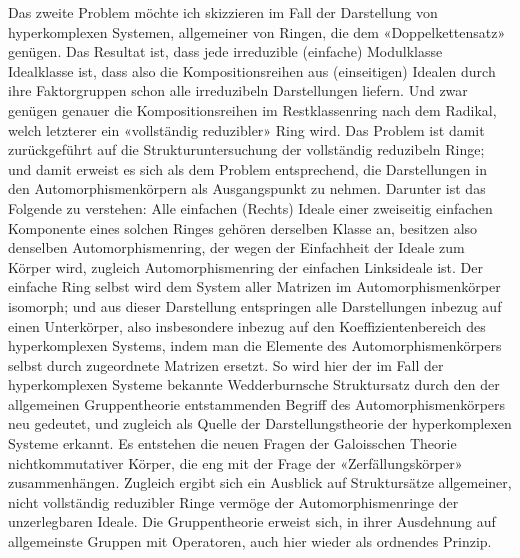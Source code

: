 \documentclass[11pt]{article}
\begin{document}
Das zweite Problem möchte ich skizzieren im Fall der Darstellung von hyperkomplexen Systemen, allgemeiner von Ringen, die dem «Doppelkettensatz» genügen. Das Resultat ist, dass jede irreduzible (einfache) Modulklasse Idealklasse ist, dass also die Kompositionsreihen aus (einseitigen) Idealen durch ihre Faktorgruppen schon alle irreduzibeln Darstellungen liefern. Und zwar genügen genauer die Kompositionsreihen im Restklassenring nach dem Radikal, welch letzterer ein «vollständig reduzibler» Ring wird. Das Problem ist damit zurückgeführt auf die Strukturuntersuchung der vollständig reduzibeln Ringe; und damit erweist es sich als dem Problem entsprechend, die Darstellungen in den Automorphismenkörpern als Ausgangspunkt zu nehmen. Darunter ist das Folgende zu verstehen: Alle einfachen (Rechts) Ideale einer zweiseitig einfachen Komponente eines solchen Ringes gehören derselben Klasse an, besitzen also denselben Automorphismenring, der wegen der Einfachheit der Ideale zum Körper wird, zugleich Automorphismenring der einfachen Linksideale ist. Der einfache Ring selbst wird dem System aller Matrizen im Automorphismenkörper isomorph; und aus dieser Darstellung entspringen alle Darstellungen inbezug auf einen Unterkörper, also insbesondere inbezug auf den Koeffizientenbereich des hyperkomplexen Systems, indem man die Elemente des Automorphismenkörpers selbst durch zugeordnete Matrizen ersetzt. So wird hier der im Fall der hyperkomplexen Systeme bekannte Wedderburnsche Struktursatz durch den der allgemeinen Gruppentheorie entstammenden Begriff des Automorphismenkörpers neu gedeutet, und zugleich als Quelle der Darstellungstheorie der hyperkomplexen Systeme erkannt. Es entstehen die neuen Fragen der Galoisschen Theorie nichtkommutativer Körper, die eng mit der Frage der «Zerfällungskörper» zusammenhängen. Zugleich ergibt sich ein Ausblick auf Struktursätze allgemeiner, nicht vollständig reduzibler Ringe vermöge der Automorphismenringe der unzerlegbaren Ideale. Die Gruppentheorie erweist sich, in ihrer Ausdehnung auf allgemeinste Gruppen mit Operatoren, auch hier wieder als ordnendes Prinzip.
\end{document}
